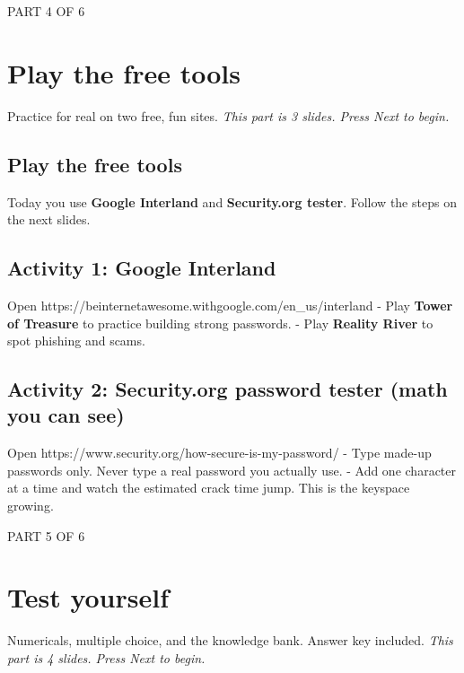 \documentclass[12pt,openany]{book}
\begin{document}
\medskip

\vspace{4pt}\noindent\textsc{PART 4 OF 6}


\section*{Play the free tools}

Practice for real on two free, fun sites.
{\small\itshape\color{gray}This part is 3 slides. Press Next to begin.}

\medskip

\subsection*{Play the free tools}

Today you use \textbf{Google Interland} and \textbf{Security.org tester}. Follow the steps on the next slides.

\medskip

\subsection*{Activity 1: Google Interland}


Open https://beinternetawesome.withgoogle.com/en\_us/interland
- Play \textbf{Tower of Treasure} to practice building strong passwords.
- Play \textbf{Reality River} to spot phishing and scams.

\medskip

\subsection*{Activity 2: Security.org password tester (math you can see)}


Open https://www.security.org/how-secure-is-my-password/
- Type made-up passwords only. Never type a real password you actually use.
- Add one character at a time and watch the estimated crack time jump. This is the keyspace growing.

\medskip

\vspace{4pt}\noindent\textsc{PART 5 OF 6}


\section*{Test yourself}

Numericals, multiple choice, and the knowledge bank. Answer key included.
{\small\itshape\color{gray}This part is 4 slides. Press Next to begin.}
\end{document}
